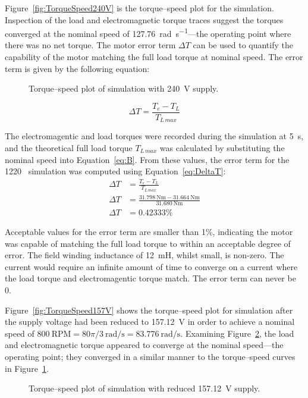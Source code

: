 \documentclass[a4paper,11pt,twocolumn]{article}
\newcommand{\s}{\si{\second}\xspace}
\newcommand{\V}{\si{\volt}\xspace}
\newcommand{\mH}{\si{\milli\henry}\xspace}
\newcommand{\Nm}{\si{\newton\metre}\xspace}
\newcommand{\rps}{\si{\radian\per\second}\xspace}
\newcommand{\RPM}{\text{RPM}\xspace}
\begin{document}
Figure~\vref{fig:TorqueSpeed240V} is the torque--speed plot for the simulation. 
Inspection of the load and electromagnetic torque traces suggest the torques 
converged at the nominal speed of 127.76~\rps---the operating point where there 
was no net torque. The motor error term $\Delta T$ can be used to quantify the 
capability of the motor matching the full load torque at nominal speed. The 
error term is given by the following equation:
\begin{figure}[t]
    \centering
    \def\svgwidth{0.8\textwidth}
    
    \caption{Torque--speed plot of simulation with 240~\V supply.}
    \label{fig:TorqueSpeed240V}
\end{figure}
\begin{equation} \label{eq:DeltaT}
    \Delta T = \frac{T_e - T_L}{T_{L\,max}}
\end{equation}

The electromagentic and load torques were recorded during the simulation at 
5~\s, and the theoretical full load torque $T_{L\,max}$ was calculated by 
substituting the nominal speed into Equation~\ref{eq:B}. From these values, the 
error term for the 1220~\RPM simulation was computed using 
Equation~\ref{eq:DeltaT}:
\begin{align*}
    \Delta T &= \frac{T_e - T_L}{T_{L\,max}} \\
    \Delta T &= \frac{31.798~\Nm - 31.664~\Nm}{31.680~\Nm} \\
    \Delta T &= 0.42333\%
\end{align*}

Acceptable values for the error term are smaller than 1\%, indicating the motor 
was capable of matching the full load torque to within an acceptable degree of 
error. The field winding inductance of 12~\mH, whilst small, is non-zero. The 
current would require an infinite amount of time to converge on a current where 
the load torque and electromagentic torque match. The error term can never be 0.

Figure~\vref{fig:TorqueSpeed157V} shows the torque--speed plot for simulation 
after the supply voltage had been reduced to 157.12~\V in order to achieve a 
nominal speed of $800~\RPM = 80\pi/3~\rps = 83.776~\rps$. Examining 
Figure~\ref{fig:TorqueSpeed157V}, the load and electromagnetic torque appeared 
to converge at the nominal speed---the operating point; they converged in a 
similar manner to the torque--speed curves in Figure~\ref{fig:TorqueSpeed240V}.
\begin{figure}[t]
    \centering
    \def\svgwidth{0.8\textwidth}
    
    \caption{Torque--speed plot of simulation with reduced 157.12~\V supply.}
    \label{fig:TorqueSpeed157V}
\end{figure}
\end{document}
